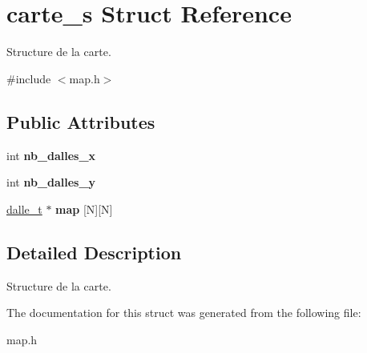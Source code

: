 \hypertarget{structcarte__s}{}\section{carte\+\_\+s Struct Reference}
\label{structcarte__s}


Structure de la carte.  




{\ttfamily \#include $<$map.\+h$>$}

\subsection*{Public Attributes}
\begin{DoxyCompactItemize}
\item 
\mbox{\label{structcarte__s_a85693e9aff5af8dd84610b5c705314f1}} 
int {\bfseries nb\+\_\+dalles\+\_\+x}
\item 
\mbox{\label{structcarte__s_a7cd6880b4e2ccb2c05a81fc899daccc4}} 
int {\bfseries nb\+\_\+dalles\+\_\+y}
\item 
\mbox{\label{structcarte__s_a502419aacade5e05e1b5131c88016472}} 
\mbox{\hyperlink{structdalle__s}{dalle\+\_\+t}} $\ast$ {\bfseries map} \mbox{[}N\mbox{]}\mbox{[}N\mbox{]}
\end{DoxyCompactItemize}


\subsection{Detailed Description}
Structure de la carte. 

The documentation for this struct was generated from the following file\+:\begin{DoxyCompactItemize}
\item 
map.\+h\end{DoxyCompactItemize}

